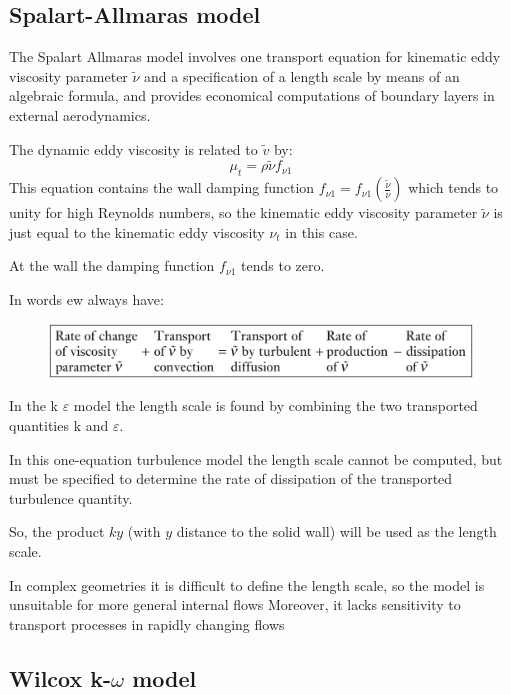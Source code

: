 \documentclass[a4paper, 15pt]{article}
\begin{document}
\subsection{Spalart-Allmaras model}

	The
	Spalart Allmaras model involves one transport equation for kinematic eddy viscosity
	parameter $\widetilde{\nu}$ and a specification of a length scale by means of an algebraic formula, and provides
	economical computations of boundary layers in external aerodynamics. \newline 
	
	The dynamic eddy viscosity is related to $\widetilde{v}$ by:
	\[\mu_t = \rho\widetilde{\nu}f_{\nu1}\]
	This
	equation contains the wall damping function $f_{\nu1} = f_{\nu1}\left(\frac{\widetilde{\nu}}{\nu}\right)$ which tends to unity for high
	Reynolds numbers, so the kinematic eddy viscosity parameter $\widetilde{\nu}$ is just equal to the kinematic
	eddy viscosity $\nu_t$ in this case. 
	
	At the wall the damping function $f_{\nu1}$ tends to zero. \newline 
	
	In words ew always have:
	\begin{figure}[H]
		\centering
		\includegraphics[width=0.5\linewidth]{fig/screenshot004}
		\label{fig:screenshot004}
	\end{figure}
	In
	the k $\varepsilon$ model the length scale is found by combining the two transported quantities k and $\varepsilon$. 
	
	In this one-equation turbulence model the length scale cannot be computed, but must be specified
	to determine the rate of dissipation of the transported turbulence quantity.
	
	So, the product $ky$ (with $y$ distance to the solid
	wall) will be used as the length scale. \newline 
	
	In
	complex geometries it is difficult to define the length scale, so the model is unsuitable for
	more general internal flows Moreover, it lacks sensitivity to transport processes in rapidly
	changing flows

\subsection{Wilcox k-$\omega$ model}
\end{document}
